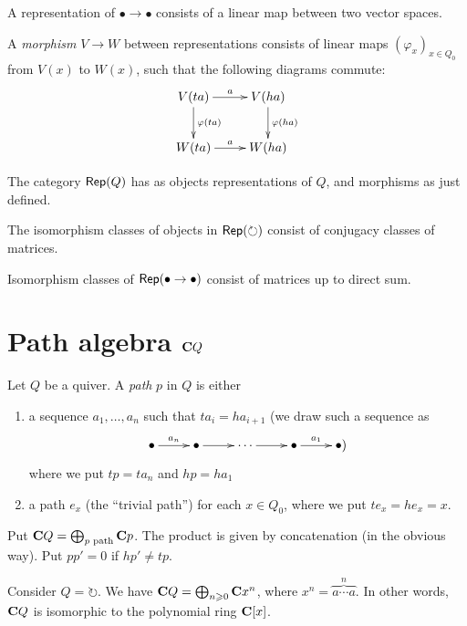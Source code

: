 \documentclass{article}
\begin{document}
\begin{example}
A representation of $\bullet \to \bullet$ consists of a linear map between two 
vector spaces. 
\end{example}

A \emph{morphism} $V\to W$ between representations consists of linear maps 
$(\varphi_x)_{x\in Q_0}$ from $V(x)$ to $W(x)$, such that the following 
diagrams commute:
\[\xymatrix{
  V(t a) \ar[r]^-a \ar[d]^-{\varphi(t a)} 
    & V(h a) \ar[d]^-{\varphi(h a)} \\
  W(t a) \ar[r]^-a 
    & W(h a) 
}\]

The category $\operatorname{\mathsf{Rep}}(Q)$ has as objects representations of $Q$, and 
morphisms as just defined. 

\begin{example}
The isomorphism classes of objects in $\operatorname{\mathsf{Rep}}(\circlearrowright)$ 
consist of conjugacy classes of matrices. 
\end{example}

\begin{example}
Isomorphism classes of $\operatorname{\mathsf{Rep}}(\bullet \to \bullet)$ consist of 
matrices up to direct sum. 
\end{example}





\section{Path algebra \texorpdfstring{$\mathbf{C} Q$}{C Q}}

Let $Q$ be a quiver. A \emph{path} $p$ in $Q$ is either 
\begin{enumerate}
  \item a sequence $a_1,\dots,a_n$ such that $t a_i = h a_{i+1}$ (we draw such 
    a sequence as 
    \[\xymatrix{
      \bullet \ar[r]^-{a_n} 
        & \bullet \ar[r] 
          & \cdots \ar[r] 
          & \bullet \ar[r]^-{a_1} 
          & \bullet )
    }\]
    where we put $t p = t a_n$ and $h p = h a_1$ 
  \item a path $e_x$ (the ``trivial path'') for each $x\in Q_0$, where we put 
    $t e_x = h e_x = x$. 
\end{enumerate}

Put $\mathbf{C} Q = \bigoplus_{p\text{ path}} \mathbf{C} p$. The product is given by 
concatenation (in the obvious way). Put $p p'=0$ if $h p'\ne t p$. 

\begin{example}
Consider $Q=\circlearrowright$. We have 
$\mathbf{C} Q = \bigoplus_{n\geqslant 0} \mathbf{C} x^n$, where 
$x^n = \overbrace{a \cdots a}^n$. In other words, $\mathbf{C} Q$ is isomorphic to the 
polynomial ring $\mathbf{C}[x]$. 
\end{example}
\end{document}
